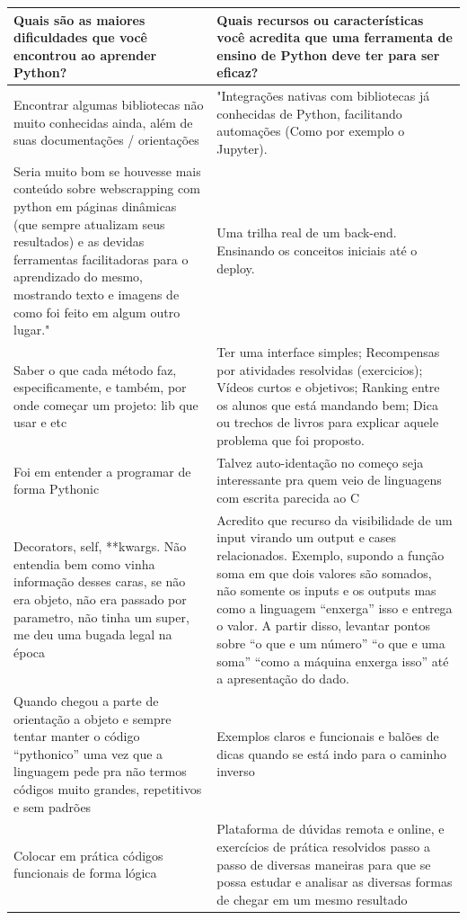 \begin{longtable}{| p{} | p{} |}
    \hline
    \textbf{Quais são as maiores dificuldades que você encontrou ao aprender Python?} & \textbf{Quais recursos ou características você acredita que uma ferramenta de ensino de Python deve ter para ser eficaz?} \\ \hline
    Encontrar algumas bibliotecas não muito conhecidas ainda, além de suas documentações / orientações & "Integrações nativas com bibliotecas já conhecidas de Python, facilitando automações (Como por exemplo o Jupyter). \\ \hline
    Seria muito bom se houvesse mais conteúdo sobre webscrapping com python em páginas dinâmicas (que sempre atualizam seus resultados) e as devidas ferramentas facilitadoras para o aprendizado do mesmo, mostrando texto e imagens de como foi feito em algum outro lugar." & Uma trilha real de um back-end. Ensinando os conceitos iniciais até o deploy. \\ \hline
    Saber o que cada método faz, especificamente, e também, por onde começar um projeto: lib que usar e etc & Ter uma interface simples;  Recompensas por atividades resolvidas (exercicios); Vídeos curtos e objetivos; Ranking entre os alunos que está mandando bem; Dica ou trechos de livros para explicar aquele problema que foi proposto. \\ \hline
    Foi em entender a programar de forma Pythonic & Talvez auto-identação no começo seja interessante pra quem veio de linguagens com escrita parecida ao C \\ \hline
    Decorators, self, **kwargs. Não entendia bem como vinha informação desses caras, se não era objeto, não era passado por parametro, não tinha um super, me deu uma bugada legal na época & Acredito que recurso da visibilidade de um input virando um output e cases relacionados. Exemplo, supondo a função soma em que dois valores são somados, não somente os inputs e os outputs mas como a linguagem “enxerga” isso e entrega o valor. A partir disso, levantar pontos sobre “o que e um número” “o que e uma soma” “como a máquina enxerga isso” até a apresentação do dado. \\ \hline
    Quando chegou a parte de orientação a objeto e sempre tentar manter o código “pythonico” uma vez que a linguagem pede pra não termos códigos muito grandes, repetitivos e sem padrões & Exemplos claros e funcionais e balões de dicas quando se está indo para o caminho inverso \\ \hline
    Colocar em prática códigos funcionais de forma lógica & Plataforma de dúvidas remota e online, e exercícios de prática resolvidos passo a passo de diversas maneiras para que se possa estudar e analisar as diversas formas de chegar em um mesmo resultado \\ \hline

\end{longtable}

